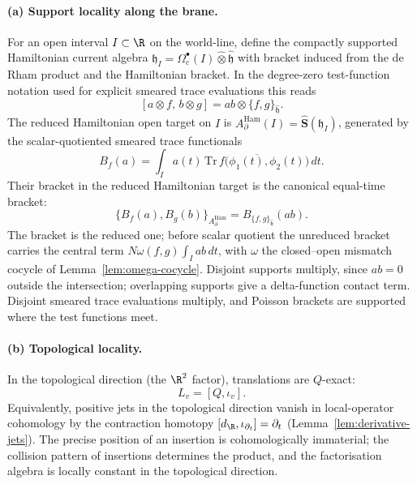 \documentclass[11pt]{memoir}
\begin{document}
\paragraph{(a) Support locality along the brane.}
For an open interval $I\subset\R$ on the world-line, define the compactly
supported Hamiltonian current algebra
  $\mathfrak h_I=\Omega_c^\bullet(I)\widehat\otimes\widehat{\mathfrak h}$ with
  bracket induced from the de Rham product and the Hamiltonian bracket.
  In the degree-zero test-function notation used for explicit smeared
  trace evaluations this reads
  $$[a\otimes f,\,b\otimes g]=ab\otimes\{f,g\}_{\widehat{\mathfrak h}}.$$
The reduced Hamiltonian open target on $I$ is
$A_\partial^{\mathrm{Ham}}(I)=\widehat{\mathbf S}(\mathfrak h_I)$,
generated by the scalar-quotiented smeared trace functionals
$$B_f(a)=\int_I a(t)\,
  \overline{\mathrm{Tr}\,f\bigl(\phi_1(t),\phi_2(t)\bigr)}\,dt.$$
Their bracket in the reduced Hamiltonian target is the canonical
equal-time bracket:
$$\bigl\{B_f(a),B_g(b)\bigr\}_{A_\partial^{\mathrm{Ham}}}
  =B_{\{f,g\}_{\widehat{\mathfrak h}}}(ab).$$
The bracket is the reduced one; before scalar quotient the unreduced
bracket carries the central term
$N\omega(f,g)\int_I ab\,dt$, with $\omega$ the closed--open mismatch
cocycle of Lemma~\ref{lem:omega-cocycle}.  Disjoint supports multiply,
since $ab=0$ outside the intersection; overlapping supports give a
delta-function contact term.  Disjoint smeared trace evaluations
multiply, and Poisson brackets are supported where the test functions
meet.

\paragraph{(b) Topological locality.}
In the topological direction (the $\R^2$ factor), translations are
$Q$-exact:
$$L_v=[Q,\iota_v].$$
Equivalently, positive jets in the topological direction vanish in
local-operator cohomology by the contraction homotopy
$[d_\R,\iota_{\partial_t}]=\partial_t$
(Lemma~\ref{lem:derivative-jets}). The precise position of an insertion
is cohomologically immaterial; the collision pattern of insertions
determines the product, and the factorisation algebra is locally constant in the topological
direction.
\end{document}

